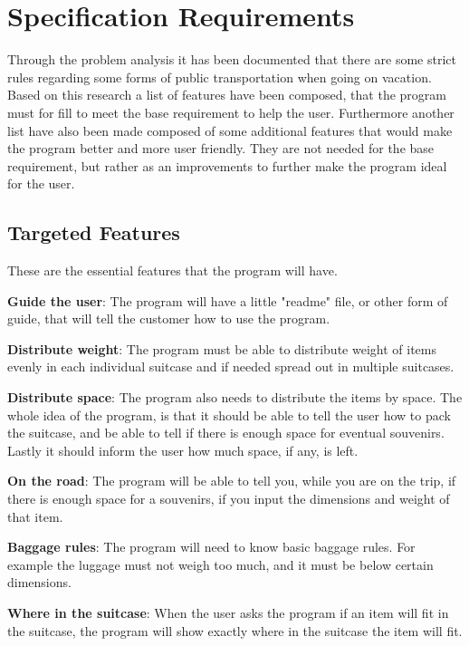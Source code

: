 \section{Specification Requirements}
\label{sec:Spec}
Through the problem analysis it has been documented that there are some strict rules regarding some forms of public transportation when going on vacation. Based on this research a list of features have been composed, that the program must for fill to meet the base requirement to help the user.
Furthermore another list have also been made composed of some additional features that would make the program better and more user friendly. They are not needed for the base requirement, but rather as an improvements to further make the program ideal for the user.

\subsection{Targeted Features}
These are the essential features that the program will have.\newline

\textbf{Guide the user}:
The program will have a little "readme" file, or other form of guide, that will tell the customer how to use the program.
\newline

\textbf{Distribute weight}:
The program must be able to distribute weight of items evenly in each individual suitcase and if needed spread out in multiple suitcases.
\newline

\textbf{Distribute space}:
The program also needs to distribute the items by space. The whole idea of the program, is that it should be able to tell the user how to pack the suitcase, and be able to tell if there is enough space for eventual souvenirs. Lastly it should inform the user how much space, if any, is left.
\newline

\textbf{On the road}:
The program will be able to tell you, while you are on the trip, if there is enough space for a souvenirs, if you input the dimensions and weight of that item.
\newline

\textbf{Baggage rules}:
The program will need to know basic baggage rules. For example the luggage must not weigh too much, and it must be below certain dimensions.
\newline

\textbf{Where in the suitcase}:
When the user asks the program if an item will fit in the suitcase, the program will show exactly where in the suitcase the item will fit.
\newline

